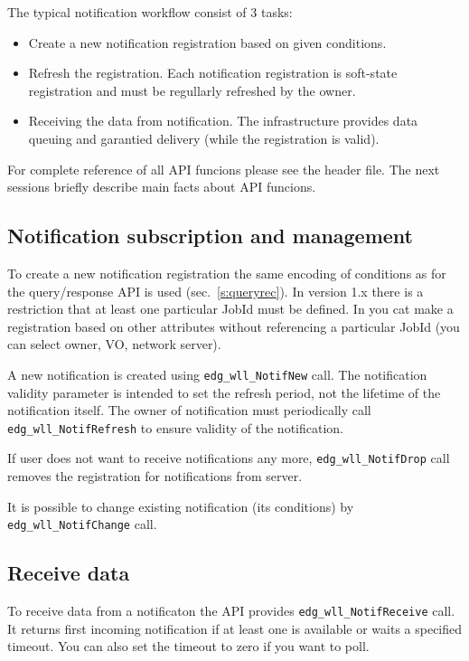 The typical notification workflow consist of 3 tasks:
\begin{itemize}
 \item Create a new notification registration based on given conditions.
 \item Refresh the registration. Each notification registration is
  soft-state registration and must be regullarly refreshed by the
  owner.
 \item Receiving the data from notification. The \LB infrastructure
  provides data queuing and garantied delivery (while the registration
  is valid).
\end{itemize}

For complete reference of all API funcions please see the header
file. The next sessions briefly describe main facts about API
funcions.

\subsection{Notification subscription and management}
To create a new notification registration the same encoding of
conditions as for the \LB query/response API is used
(sec.~\ref{s:queryrec}). In version 1.x there is a restriction that at
least one particular JobId must be defined. In  you cat make a
registration based on other attributes without referencing a
particular JobId (you can select owner, VO, network server).

A new notification is created using \verb'edg_wll_NotifNew' call. The
notification validity parameter is intended to set the refresh period,
not the lifetime of the notification itself. The owner of notification
must periodically call \verb'edg_wll_NotifRefresh' to ensure validity
of the notification.

If user does not want to receive notifications any more,
\verb'edg_wll_NotifDrop' call removes the registration for
notifications from \LB server.

It is possible to change existing notification (its conditions) by
\verb'edg_wll_NotifChange' call.

\subsection{Receive data}
To receive data from a notificaton the API provides
\verb'edg_wll_NotifReceive' call. It returns first incoming
notification if at least one is available or waits a specified timeout. You can
also set the timeout to zero if you want to poll.

